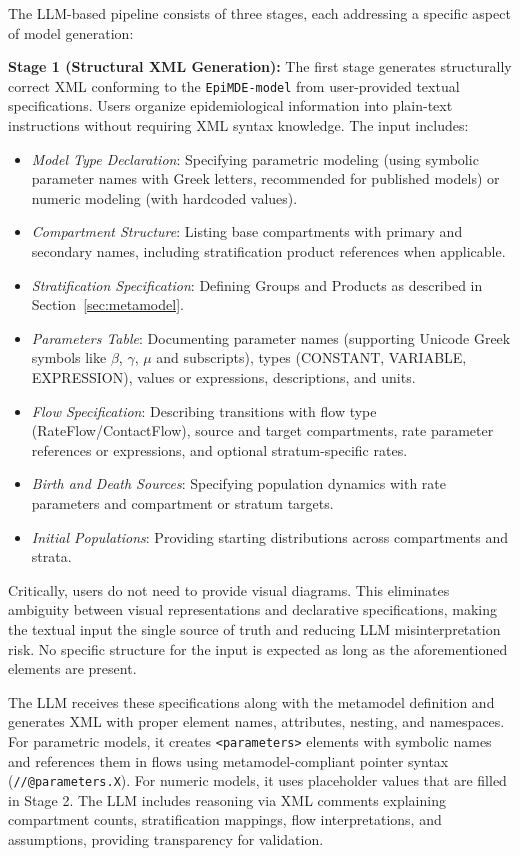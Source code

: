 The LLM-based pipeline consists of three stages, each addressing a specific aspect of model generation:

\textbf{Stage 1 (Structural XML Generation):} The first stage generates structurally correct XML conforming to the \texttt{EpiMDE-model} from user-provided textual specifications. Users organize epidemiological information into plain-text instructions without requiring XML syntax knowledge. The input includes:

\begin{itemize}
    \item \textit{Model Type Declaration}: Specifying parametric modeling (using symbolic parameter names with Greek letters, recommended for published models) or numeric modeling (with hardcoded values).
    \item \textit{Compartment Structure}: Listing base compartments with primary and secondary names, including stratification product references when applicable.
    \item \textit{Stratification Specification}: Defining Groups and Products as described in Section~\ref{sec:metamodel}.
    \item \textit{Parameters Table}: Documenting parameter names (supporting Unicode Greek symbols like $\beta$, $\gamma$, $\mu$ and subscripts), types (CONSTANT, VARIABLE, EXPRESSION), values or expressions, descriptions, and units.
    \item \textit{Flow Specification}: Describing transitions with flow type (RateFlow/ContactFlow), source and target compartments, rate parameter references or expressions, and optional stratum-specific rates.
    \item \textit{Birth and Death Sources}: Specifying population dynamics with rate parameters and compartment or stratum targets.
    \item \textit{Initial Populations}: Providing starting distributions across compartments and strata.
\end{itemize}

Critically, users do not need to provide visual diagrams. This eliminates ambiguity between visual representations and declarative specifications, making the textual input the single source of truth and reducing LLM misinterpretation risk. No specific structure for the input is expected as long as the aforementioned elements are present.

The LLM receives these specifications along with the metamodel definition and generates XML with proper element names, attributes, nesting, and namespaces. For parametric models, it creates \texttt{<parameters>} elements with symbolic names and references them in flows using metamodel-compliant pointer syntax (\texttt{//@parameters.X}). For numeric models, it uses placeholder values that are filled in Stage 2. The LLM includes reasoning via XML comments explaining compartment counts, stratification mappings, flow interpretations, and assumptions, providing transparency for validation.


